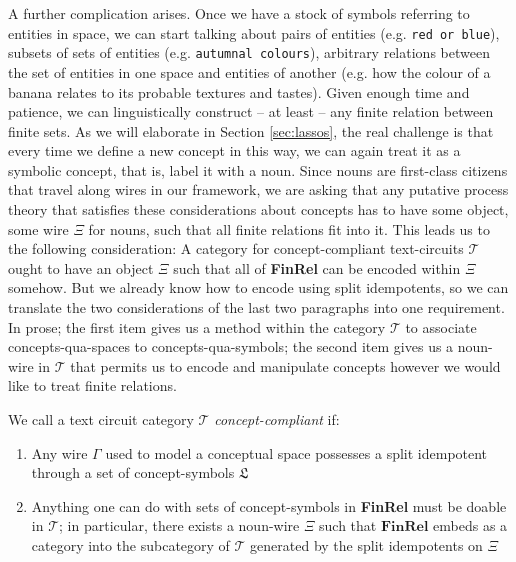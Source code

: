 A further complication arises. Once we have a stock of symbols referring to entities in space, we can start talking about pairs of entities (e.g. \texttt{red or blue}), subsets of sets of entities (e.g. \texttt{autumnal colours}), arbitrary relations between the set of entities in one space and entities of another (e.g. how the colour of a banana relates to its probable textures and tastes). Given enough time and patience, we can linguistically construct -- at least -- any finite relation between finite sets. As we will elaborate in Section \ref{sec:lassos}, the real challenge is that every time we define a new concept in this way, we can again treat it as a symbolic concept, that is, label it with a noun. Since nouns are first-class citizens that travel along wires in our framework, we are asking that any putative process theory that satisfies these considerations about concepts has to have some object, some wire $\Xi$ for nouns, such that all finite relations fit into it. This leads us to the following consideration: A category for concept-compliant text-circuits $\mathcal{T}$ ought to have an object $\Xi$ such that all of \textbf{FinRel} can be encoded within $\Xi$ somehow. But we already know how to encode using split idempotents, so we can translate the two considerations of the last two paragraphs into one requirement. In prose; the first item gives us a method within the category $\mathcal{T}$ to associate concepts-qua-spaces to concepts-qua-symbols; the second item gives us a noun-wire in $\mathcal{T}$ that permits us to encode and manipulate concepts however we would like to treat finite relations.

\begin{requirement}
We call a text circuit category $\mathcal{T}$ \emph{concept-compliant} if:
\begin{enumerate}
\item{Any wire $\Gamma$ used to model a conceptual space possesses a split idempotent through a set of concept-symbols $\mathfrak{L}$}
\item{Anything one can do with sets of concept-symbols in \textbf{FinRel} must be doable in $\mathcal{T}$; in particular, there exists a noun-wire $\Xi$ such that $\textbf{FinRel}$ embeds as a category into the subcategory of $\mathcal{T}$ generated by the split idempotents on $\Xi$}
\end{enumerate}
\end{requirement}


